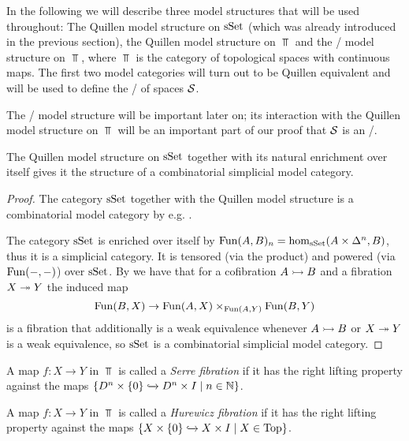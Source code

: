 In the following we will describe three model structures that will be used throughout:
The Quillen model structure on $\operatorname{sSet}$ (which was already introduced in the previous section), the Quillen model structure on $\Top$ and the \Strom/ model structure on $\Top$, where $\Top$ is the category of topological spaces with continuous maps.
The first two model categories will turn out to be Quillen equivalent and will be used to define the \inftycat/ of spaces $\mathcal{S}$.

The \Strom/ model structure will be important later on; its interaction with the Quillen model structure on $\Top$ will be an important part of our proof that $\mathcal{S}$ is an \inftytop/.
\begin{prop}\label{prop:sSetCombSimpModelStructure}
    The Quillen model structure on $\operatorname{sSet}$ together with its natural enrichment over itself gives it the structure of a combinatorial simplicial model category.
    \begin{proof}
        The category $\operatorname{sSet}$ together with the Quillen model structure is a combinatorial model category by e.g. \cite[Remark 7.11.15]{cisinski_2019}.
        
        The category $\operatorname{sSet}$ is enriched over itself by $\operatorname{Fun}(A,B)_n=\hom_{\operatorname{sSet}}(A\times\Delta^n,B)$, thus it is a simplicial category.
        It is tensored (via the product) and powered (via $\operatorname{Fun}(-,-)$) over $\operatorname{sSet}$.
        By \cite[Corollary 1.4.5.6, Theorem 3.1.3.1 and Theorem 3.1.3.5]{kerodon} we have that for a cofibration $A\xtailrightarrow{} B$ and a fibration $X\xtwoheadrightarrow{} Y$ the induced map 
        \begin{equation*}
            \operatorname{Fun}(B,X)\to\operatorname{Fun}(A,X)\times_{\operatorname{Fun}(A,Y)}\operatorname{Fun}(B,Y)
        \end{equation*}
        is a fibration that additionally is a weak equivalence whenever $A\xtailrightarrow{} B$ or $X\xtwoheadrightarrow{} Y$ is a weak equivalence, so $\operatorname{sSet}$ is a combinatorial simplicial model category.
    \end{proof}
\end{prop}
\begin{definition}
    A map $f\colon X\to Y$ in $\Top$ is called a \emph{Serre fibration} if it has the right lifting property against the maps $\left\lbrace D^n\times\left\lbrace0\right\rbrace\xhookrightarrow{}D^n\times I\mid n\in\mathbb{N}\right\rbrace$.
\end{definition}
\begin{definition}
    A map $f\colon X\to Y$ in $\Top$ is called a \emph{Hurewicz fibration} if it has the right lifting property against the maps $\left\lbrace X\times\left\lbrace0\right\rbrace\xhookrightarrow{}X\times I\mid X\in\operatorname{Top}\right\rbrace$.
\end{definition}
